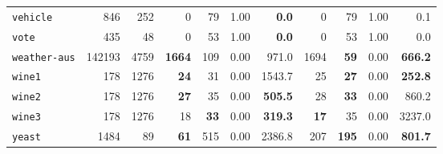 \begin{tabular}{lccrrrrrrrr}
\texttt{vehicle} & \multicolumn{1}{r}{846} & \multicolumn{1}{r}{252}  & 0 & 79 & 1.00 & \textbf{0.0} & 0 & 79 & 1.00 & 0.1\\
\texttt{vote} & \multicolumn{1}{r}{435} & \multicolumn{1}{r}{48}  & 0 & 53 & 1.00 & \textbf{0.0} & 0 & 53 & 1.00 & 0.0\\
\texttt{weather-aus} & \multicolumn{1}{r}{142193} & \multicolumn{1}{r}{4759}  & \textbf{1664} & 109 & 0.00 & 971.0 & 1694 & \textbf{59} & 0.00 & \textbf{666.2}\\
\texttt{wine1} & \multicolumn{1}{r}{178} & \multicolumn{1}{r}{1276}  & \textbf{24} & 31 & 0.00 & 1543.7 & 25 & \textbf{27} & 0.00 & \textbf{252.8}\\
\texttt{wine2} & \multicolumn{1}{r}{178} & \multicolumn{1}{r}{1276}  & \textbf{27} & 35 & 0.00 & \textbf{505.5} & 28 & \textbf{33} & 0.00 & 860.2\\
\texttt{wine3} & \multicolumn{1}{r}{178} & \multicolumn{1}{r}{1276}  & 18 & \textbf{33} & 0.00 & \textbf{319.3} & \textbf{17} & 35 & 0.00 & 3237.0\\
\texttt{yeast} & \multicolumn{1}{r}{1484} & \multicolumn{1}{r}{89}  & \textbf{61} & 515 & 0.00 & 2386.8 & 207 & \textbf{195} & 0.00 & \textbf{801.7}\\
\bottomrule
\end{tabular}
